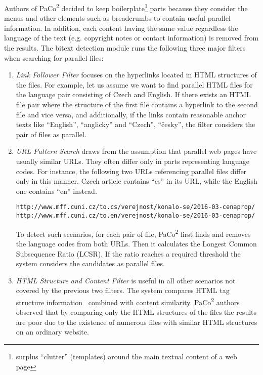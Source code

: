 \begin{enumerate}
	Authors of PaCo\textsuperscript{2} decided to keep boilerplate\footnote{surplus ``clutter'' (templates) around the main textual content of a web page} parts because they consider the menus and other elements such as breadcrumbs to contain useful parallel information. In addition, each content having the same value regardless the language of the text (e.g. copyright notes or contact information) is removed from the results. The bitext detection module runs the following three major filters when searching for parallel files:
	
	\begin{enumerate}
		\item \textit{Link Follower Filter} focuses on the hyperlinks located in HTML structures of the files. For example, let us assume we want to find parallel HTML files for the language pair consisting of Czech and English. If there exists an HTML file pair where the structure of the first file contains a hyperlink to the second file and vice versa, and additionally, if the links contain reasonable anchor texts like ``English'', ``anglicky'' and ``Czech'', ``česky'', the filter considers the pair of files as parallel.
		
		\item \textit{URL Pattern Search} draws from the assumption that parallel web pages have usually similar URLs. They often differ only in parts representing language codes. For instance, the following two URLs referencing parallel files differ only in this manner. Czech article contains ``cs'' in its URL, while the English one contains ``en'' instead.
		
		\vspace{1em}
		\footnotesize
		\texttt{http://www.mff.cuni.cz/to.cs/verejnost/konalo-se/2016-03-cenaprop/}\newline
		\texttt{http://www.mff.cuni.cz/to.en/verejnost/konalo-se/2016-03-cenaprop/}
		\normalsize
		\vspace{1em}
		
		To detect such scenarios, for each pair of file, PaCo\textsuperscript{2} first finds and removes the language codes from both URLs. Then it calculates the Longest Common Subsequence Ratio (LCSR). If the ratio reaches a required threshold the system considers the candidates as parallel files.
		
		\item \textit{HTML Structure and Content Filter} is useful in all other scenarios not covered by the previous two filters. The system compares HTML tag structure information~\cite{Resnik03} combined with content similarity. PaCo\textsuperscript{2} authors observed that by comparing only the HTML structures of the files the results are poor due to the existence of numerous files with similar HTML structures on an ordinary website. 
		

\end{enumerate}
\end{enumerate}
